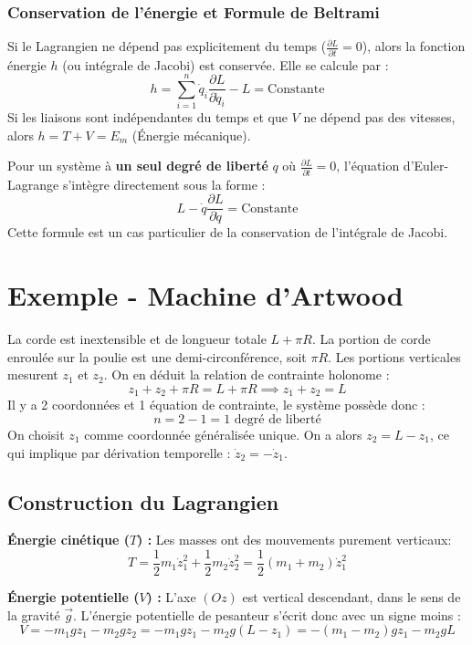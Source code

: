 \documentclass[french]{yLectureNote}
\renewcommand{\vec}{\overrightarrow}
\begin{document}
\subsubsection{Conservation de l'énergie et Formule de Beltrami}

\begin{definition}
Si le Lagrangien ne dépend pas explicitement du temps ($\frac{\partial L}{\partial t} = 0$), alors la fonction énergie $h$ (ou intégrale de Jacobi) est conservée. Elle se calcule par :
$$h = \sum_{i=1}^n \dot{q}_i \frac{\partial L}{\partial \dot{q}_i} - L = \text{Constante}$$
Si les liaisons sont indépendantes du temps et que $V$ ne dépend pas des vitesses, alors $h = T + V = E_m$ (Énergie mécanique).
\end{definition}

\begin{theorem}
Pour un système à \textbf{un seul degré de liberté} $q$ où $\frac{\partial L}{\partial t} = 0$, l'équation d'Euler-Lagrange s'intègre directement sous la forme :
$$L - \dot{q}\frac{\partial L}{\partial \dot{q}} = \text{Constante}$$
Cette formule est un cas particulier de la conservation de l'intégrale de Jacobi.
\end{theorem}
\section{Exemple - Machine d'Artwood}
La corde est inextensible et de longueur totale $L + \pi R$. La portion de corde enroulée sur la poulie est une demi-circonférence, soit $\pi R$. Les portions verticales mesurent $z_1$ et $z_2$. On en déduit la relation de contrainte holonome :
$$z_1 + z_2 + \pi R = L + \pi R \implies z_1 + z_2 = L$$
Il y a 2 coordonnées et 1 équation de contrainte, le système possède donc :
$$n = 2 - 1 = 1 \text{ degré de liberté}$$
On choisit $z_1$ comme coordonnée généralisée unique. On a alors $z_2 = L - z_1$, ce qui implique par dérivation temporelle : $\dot{z}_2 = -\dot{z}_1$.

\subsection{Construction du Lagrangien}
\textbf{Énergie cinétique ($T$) :} 
Les masses ont des mouvements purement verticaux:
$$T = \frac{1}{2}m_1\dot{z}_1^2 + \frac{1}{2}m_2\dot{z}_2^2 = \frac{1}{2}(m_1 + m_2)\dot{z}_1^2$$

\textbf{Énergie potentielle ($V$) :}
L'axe $(Oz)$ est vertical descendant, dans le sens de la gravité $\vec{g}$. L'énergie potentielle de pesanteur s'écrit donc avec un signe moins :
$$V = -m_1gz_1 - m_2gz_2 = -m_1gz_1 - m_2g(L - z_1) = -(m_1 - m_2)gz_1 - m_2gL$$
\end{document}
